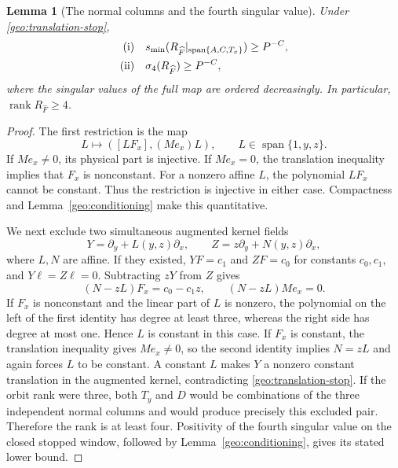 \documentclass[11pt]{amsart}
\newtheorem{lemma}[theorem]{Lemma}
\theoremstyle{definition}
\theoremstyle{remark}
\numberwithin{equation}{section}
\begin{document}
\begin{lemma}[The normal columns and the fourth singular value]\label{geo:normal-pivot}
Under \eqref{geo:translation-stop},
\[
\begin{aligned}
\textup{(i)}\quad &s_{\min}(R_{\widehat F}|_{\operatorname{span}\{A,C,T_x\}})\ge P^{-C},\\
\textup{(ii)}\quad &\sigma_4(R_{\widehat F})\ge P^{-C},
\end{aligned}
\]
where the singular values of the full map are ordered decreasingly. In particular, $\operatorname{rank}R_{\widehat F}\ge4$.
\end{lemma}
\begin{proof}
The first restriction is the map
\[
L\longmapsto([LF_x],(Me_x)L),\qquad L\in\operatorname{span}\{1,y,z\}.
\]
If $Me_x\ne0$, its physical part is injective. If $Me_x=0$, the translation inequality implies that $F_x$ is nonconstant. For a nonzero affine $L$, the polynomial $LF_x$ cannot be constant. Thus the restriction is injective in either case. Compactness and Lemma~\ref{geo:conditioning} make this quantitative.

We next exclude two simultaneous augmented kernel fields
\[
Y=\partial_y+L(y,z)\partial_x,\qquad Z=z\partial_y+N(y,z)\partial_x,
\]
where $L,N$ are affine. If they existed, $YF=c_1$ and $ZF=c_0$ for constants $c_0,c_1$, and $Y\ell=Z\ell=0$. Subtracting $zY$ from $Z$ gives
\[
(N-zL)F_x=c_0-c_1z,\qquad (N-zL)Me_x=0.
\]
If $F_x$ is nonconstant and the linear part of $L$ is nonzero, the polynomial on the left of the first identity has degree at least three, whereas the right side has degree at most one. Hence $L$ is constant in this case. If $F_x$ is constant, the translation inequality gives $Me_x\ne0$, so the second identity implies $N=zL$ and again forces $L$ to be constant. A constant $L$ makes $Y$ a nonzero constant translation in the augmented kernel, contradicting \eqref{geo:translation-stop}. If the orbit rank were three, both $T_y$ and $D$ would be combinations of the three independent normal columns and would produce precisely this excluded pair. Therefore the rank is at least four. Positivity of the fourth singular value on the closed stopped window, followed by Lemma~\ref{geo:conditioning}, gives its stated lower bound.
\end{proof}
\end{document}
